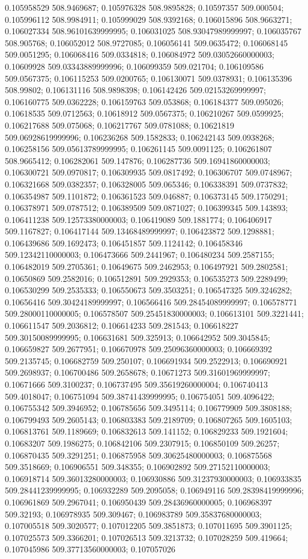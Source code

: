 0.105958529 508.9469687; 0.105976328 508.9895828; 0.10597357 509.000504; 0.105996112 508.9984911; 0.105999029 508.9392168; 0.106015896 508.9663271; 0.106027334 508.96101639999995; 0.106031025 508.93047989999997; 0.106035767 508.905768; 0.106052012 508.9727085; 0.106056141 509.0635472; 0.106068145 509.0051295; 0.106068416 509.0334818; 0.106084972 509.03052660000003; 0.10609928 509.03343889999996; 0.106099359 509.021704; 0.106109586 509.0567375; 0.106115253 509.0200765; 0.106130071 509.0378931; 0.106135396 508.99802; 0.106131116 508.9898398; 0.106142426 509.02153269999997; 0.106160775 509.0362228; 0.106159763 509.053868; 0.106184377 509.095026; 0.10618535 509.0712563; 0.10618912 509.0567375; 0.106210267 509.0599925; 0.106217688 509.075068; 0.106217767 509.0781088; 0.10621819 509.06928619999996; 0.106236268 509.1582833; 0.106242143 509.0938268; 0.106258156 509.05613789999995; 0.106261145 509.0091125; 0.106261807 508.9665412; 0.106282061 509.147876; 0.106287736 509.16941860000003; 0.106300721 509.0970817; 0.106309935 509.0817492; 0.106306707 509.0748967; 0.106321668 509.0382357; 0.106328005 509.065346; 0.106338391 509.0737832; 0.106354987 509.1101872; 0.106361523 509.046887; 0.106373145 509.1750291; 0.106378971 509.0787512; 0.106389509 509.0871027; 0.106399345 509.143893; 0.106411238 509.12573380000003; 0.106419089 509.1881774; 0.106406917 509.1167827; 0.106417144 509.13468489999997; 0.106423872 509.1298881; 0.106439686 509.1692473; 0.106451857 509.1124142; 0.106458346 509.12342110000003; 0.106473666 509.2441967; 0.106480234 509.2587155; 0.106482019 509.2705361; 0.10649675 509.2462953; 0.106497921 509.2802581; 0.10650869 509.2582016; 0.106512891 509.2929353; 0.106535273 509.2289499; 0.106530299 509.2535333; 0.106550673 509.3503251; 0.106547325 509.3246282; 0.10656416 509.30424189999997; 0.106566416 509.28454089999997; 0.106578771 509.28000110000005; 0.106578507 509.25451830000003; 0.106613101 509.3221441; 0.106611547 509.2036812; 0.106614233 509.281543; 0.106618227 509.30150089999995; 0.106631681 509.325913; 0.106642952 509.3045845; 0.106659827 509.2677951; 0.106670978 509.25096360000003; 0.106669392 509.2135745; 0.106682759 509.250107; 0.106691934 509.2522913; 0.106690921 509.2698937; 0.106700486 509.2658678; 0.10671273 509.31601969999997; 0.10671666 509.3100237; 0.106737495 509.35619260000004; 0.106740413 509.4018047; 0.106751094 509.38741439999995; 0.106754051 509.4096422; 0.106755342 509.3946952; 0.106785656 509.3495114; 0.106779909 509.3808188; 0.106799493 509.2605143; 0.106803383 509.2189709; 0.106807265 509.1605103; 0.106813761 509.1189669; 0.106832613 509.141152; 0.106829233 509.1921604; 0.10683207 509.1986275; 0.106842106 509.2307915; 0.106850109 509.26257; 0.106870435 509.3291251; 0.106875958 509.30625480000003; 0.106875568 509.3518669; 0.106906551 509.348355; 0.106902892 509.27152110000003; 0.106918714 509.36013280000003; 0.106930886 509.31237930000003; 0.106933835 509.28441239999995; 0.106932289 509.2095058; 0.106949116 509.28398419999996; 0.106961869 509.2967041; 0.106950439 509.28436960000005; 0.106968397 509.32193; 0.106978935 509.309467; 0.106983789 509.35837680000003; 0.107005518 509.3020577; 0.107012205 509.3851873; 0.107011695 509.3901125; 0.107025573 509.3366201; 0.107026513 509.3213732; 0.107028259 509.419664; 0.107045986 509.37713560000003; 0.107057026 